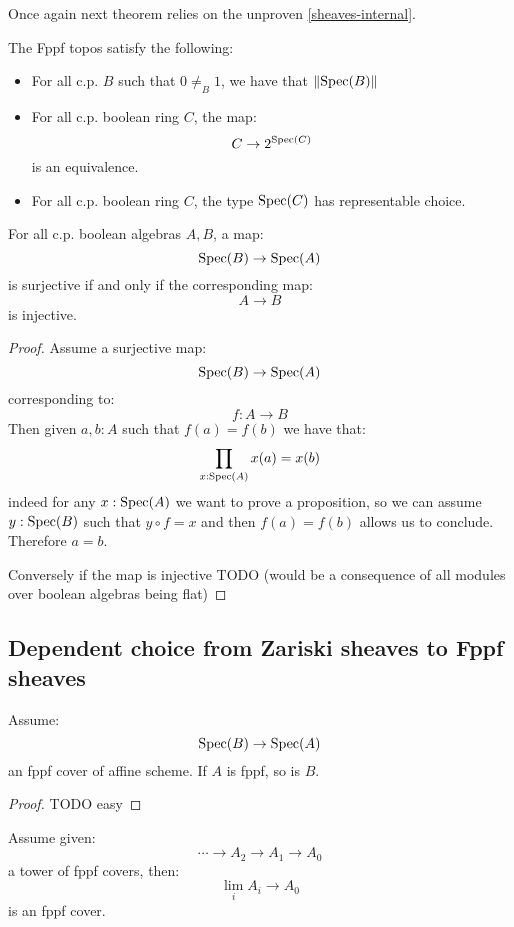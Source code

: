 Once again next theorem relies on the unproven \cref{sheaves-internal}.

\begin{theorem}
The Fppf topos satisfy the following:
\begin{itemize}
\item For all c.p. $B$ such that $0\not=_B1$, we have that $\lVert \operatorname{Spec}(B) \rVert$
\item For all c.p. boolean ring $C$, the map:
\[C\to 2^{\operatorname{Spec}(C)}\]
is an equivalence.
\item For all c.p. boolean ring $C$, the type $\operatorname{Spec}(C)$ has representable choice.
\end{itemize}
\end{theorem}

\begin{lemma}
For all c.p. boolean algebras $A,B$, a map:
\[\operatorname{Spec}(B)\to \operatorname{Spec}(A)\]
is surjective if and only if the corresponding map:
\[A\to B\]
is injective.
\end{lemma}

\begin{proof}
Assume a surjective map:
\[\operatorname{Spec}(B)\to \operatorname{Spec}(A)\]
corresponding to:
\[f:A\to B\]
Then given $a,b:A$ such that $f(a)=f(b)$ we have that:
\[\prod_{x:\operatorname{Spec}(A)} x(a) = x(b)\]
indeed for any $x:\operatorname{Spec}(A)$ we want to prove a proposition, so we can assume $y:\operatorname{Spec}(B)$ such that $y\circ f = x$ and then $f(a)=f(b)$ allows us to conclude. Therefore $a=b$.

Conversely if the map is injective TODO (would be a consequence of all modules over boolean algebras being flat)
\end{proof}


\subsection{Dependent choice from Zariski sheaves to Fppf sheaves}

\begin{lemma}\label{fppf-stable-sigma}
Assume:
\[\operatorname{Spec}(B) \to \operatorname{Spec}(A)\]
an fppf cover of affine scheme. If $A$ is fppf, so is $B$.
\end{lemma}

\begin{proof}
TODO easy
\end{proof}

\begin{lemma}\label{fppf-cover-transfinite-composition}
Assume given:
\[\cdots \to A_2\to A_1 \to A_0 \]
a tower of fppf covers, then:
\[\lim_i A_i \to A_0\]
is an fppf cover.
\end{lemma}

